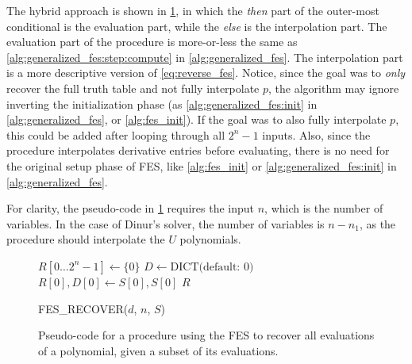 The hybrid approach is shown in \cref{alg:fes_recover}, in which the \textit{then} part of the outer-most conditional is the evaluation part, while the \textit{else} is the interpolation part. The evaluation part of the procedure is more-or-less the same as \cref{alg:generalized_fes:step:compute} in \cref{alg:generalized_fes}. The interpolation part is a more descriptive version of \cref{eq:reverse_fes}. Notice, since the goal was to \textit{only} recover the full truth table and not fully interpolate $p$, the algorithm may ignore inverting the initialization phase (as \cref{alg:generalized_fes:init} in \cref{alg:generalized_fes}, or \cref{alg:fes_init}). If the goal was to also fully interpolate $p$, this could be added after looping through all $2^n - 1$ inputs. Also, since the procedure interpolates derivative entries before evaluating, there is no need for the original setup phase of FES, like \cref{alg:fes_init} or \cref{alg:generalized_fes:init} in \cref{alg:generalized_fes}. 

For clarity, the pseudo-code in \cref{alg:fes_recover} requires the input $n$, which is the number of variables. In the case of Dinur's solver, the number of variables is $n - n_1$, as the procedure should interpolate the $U$ polynomials.

\begin{figure}[h!t]
    \begin{alg}
        $R[0\dots 2^n - 1] \gets \{0\}$\;
        $D \gets \text{DICT(default: 0)}$\;
        $R[0], D[0] \gets S[0], S[0]$\;
        \Return $R$\;
        \caption{FES\_RECOVER($d$, $n$, $S$)} \label{alg:fes_recover}
    \end{alg}
    \caption{Pseudo-code for a procedure using the FES to recover all evaluations of a polynomial, given a subset of its evaluations.}
\end{figure}


\newpage
